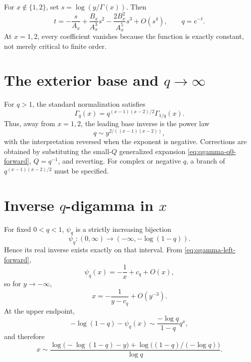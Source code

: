 \documentclass[11pt,letterpaper,oneside,openany]{book}
\theoremstyle{definition}
\theoremstyle{remark}
\begin{document}
For \(x\notin\{1,2\}\), set \(s=\log(y/\Gamma(x))\).  Then
\begin{equation}\label{eq:qgamma-q1-inverse}
 t=-\frac{s}{A_x}+\frac{B_x}{A_x^3}s^2
 -\frac{2B_x^2}{A_x^5}s^3+O(s^4),
 \qquad q=e^{-t}.
\end{equation}
At \(x=1,2\), every coefficient vanishes because the function is exactly
constant, not merely critical to finite order.

\section{The exterior base and \texorpdfstring{\(q\to\infty\)}{q to infinity}}
For \(q>1\), the standard normalization satisfies
\begin{equation}\label{eq:qgamma-reciprocity}
 \Gamma_q(x)=q^{(x-1)(x-2)/2}\Gamma_{1/q}(x).
\end{equation}
Thus, away from \(x=1,2\), the leading base inverse is the power law
\begin{equation}\label{eq:qgamma-infinity-inverse}
 q\sim y^{2/((x-1)(x-2))},
\end{equation}
with the interpretation reversed when the exponent is negative.  Corrections
are obtained by substituting the small-\(Q\) generalized expansion
\eqref{eq:qgamma-q0-forward}, \(Q=q^{-1}\), and reverting.  For complex or
negative \(q\), a branch of \(q^{(x-1)(x-2)/2}\) must be specified.

\section{Inverse \texorpdfstring{\(q\)}{q}-digamma in \texorpdfstring{\(x\)}{x}}
For fixed \(0<q<1\), \(\psi_q\) is a strictly increasing bijection
\[
 \psi_q:(0,\infty)\longrightarrow(-\infty,-\log(1-q)).
\]
Hence its real inverse exists exactly on that interval.  From
\eqref{eq:qgamma-left-forward},
\[
 \psi_q(x)=-\frac1x+c_q+O(x),
\]
so for \(y\to-\infty\),
\begin{equation}\label{eq:qdigamma-left-inverse}
 x=-\frac1{y-c_q}+O(y^{-3}).
\end{equation}
At the upper endpoint,
\[
 -\log(1-q)-\psi_q(x)
 \sim\frac{-\log q}{1-q}q^x,
\]
and therefore
\begin{equation}\label{eq:qdigamma-right-inverse}
 x\sim
 \frac{\log\bigl(-\log(1-q)-y\bigr)
 +\log\bigl((1-q)/(-\log q)\bigr)}{\log q}.
\end{equation}
\end{document}
